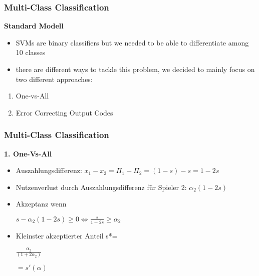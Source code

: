 \documentclass[10pt, compress]{beamer}
\begin{document}
\begin{frame}[fragile]
\frametitle{Multi-Class Classification}

\textbf{Standard Modell}
\begin{itemize}
\item SVMs are binary classifiers but we needed to be able to differentiate among 10 classes
\item there are different ways to tackle this problem, we decided to mainly focus on two different approaches: 
\end{itemize}
\begin{enumerate}
\item One-vs-All 
\item Error Correcting Output Codes
\end{enumerate}

\end{frame}

\begin{frame}[fragile]
\frametitle{Multi-Class Classification}

\textbf{\alert{1. One-Vs-All}}
\begin{itemize}
\item Auszahlungsdifferenz: \(x_1-x_2=\Pi_1 - \Pi_2 = (1-s) -s = {1-2s}\)

\item Nutzenverlust durch Auszahlungsdifferenz für Spieler 2:  \(\alpha_2 (1-2s)\)

\item Akzeptanz wenn \begin{large}\(s-\alpha_2 (1-2s) \geq 0 \Leftrightarrow \frac{s}{1-2s} \geq \alpha_2\)\end{large}

\item Kleinster akzeptierter Anteil s*=\begin{Large} \(\frac{\alpha_2}{(1+2\alpha_2)}\)\end{Large} \(=s'(\alpha)\) %


\end{itemize} %

\end{frame}
\end{document}
